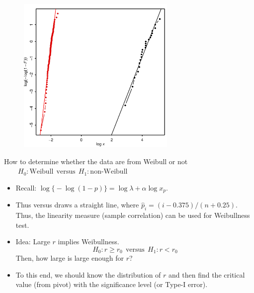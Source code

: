 \begin{frame}   %
\begin{figure}[h]
   \includegraphics[width=3.0in]{Weibull4.pdf} %
   \vspace{-3ex}
\end{figure}
\end{frame}



\begin{frame}   %
\begin{block}{How to determine whether the data are from Weibull or not}
\( \qquad
H_0: \text{Weibull}   \mathrm{~~versus~~}   H_1: \text{non-Weibull}  \)
\end{block}
\begin{itemize}
\item Recall: $\log\big\{ -\log(1-p) \big\} = \log\lambda + \alpha \log x_p.$
\item Thus  versus 
draws a straight line, where $\hat{p}_i= (i-0.375)/(n+0.25)$.
Thus, the linearity measure (sample correlation) can be used for Weibullness test.
\item Idea: Large $r$ implies Weibullness.
\[ \boxed{  H_0: r \ge r_0  \mathrm{~~versus~~} H_1:  r < r_0 } \]
  Then,  how large is large enough for $r$? 
\item To this end, we should know the distribution of $r$ and then find the critical value
(from pivot) with the significance level (or Type-I error).
\end{itemize} 
\end{frame}


